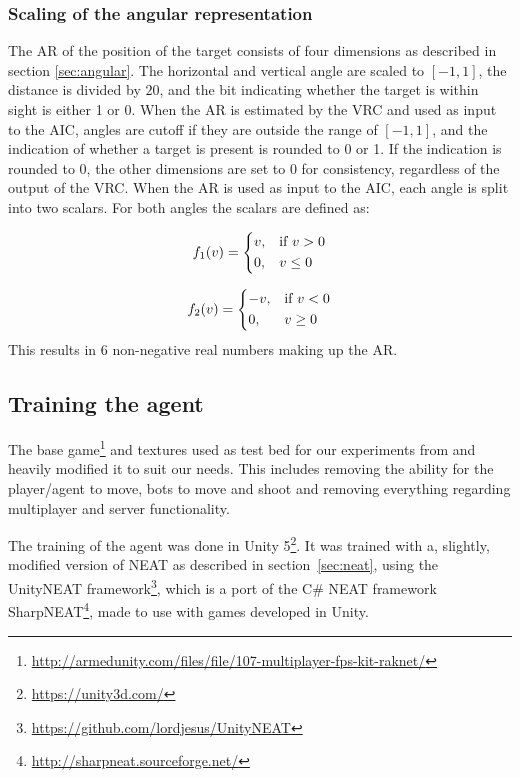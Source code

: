 \subsubsection{Scaling of the angular representation}
The AR of the position of the target consists of four dimensions as described in section \ref{sec:angular}. The horizontal and vertical angle are scaled to $[-1,1]$, the distance is divided by $20$, and the bit indicating whether the target is within sight is either 1 or 0. When the AR is estimated by the VRC and used as input to the AIC, angles are cutoff if they are outside the range of $[-1,1]$, and the indication of whether a target is present is rounded to 0 or 1. If the indication is rounded to 0, the other dimensions are set to 0 for consistency, regardless of the output of the VRC. When the AR is used as input to the AIC, each angle is split into two scalars. For both angles the scalars are defined as:

\[
    f_1(v) =  
\begin{dcases}
    v,& \text{if } v > 0\\
    0,              & v \leq 0
\end{dcases}
\]

\[
    f_2(v) =  
\begin{dcases}
    -v,& \text{if } v < 0\\
    0,              & v \geq 0
\end{dcases}
\]
\noindent
This results in 6 non-negative real numbers making up the AR.

\subsection{Training the agent}
\label{sub:training-neat}
The base game\footnote{\url{http://armedunity.com/files/file/107-multiplayer-fps-kit-raknet/}} and textures used as test bed for our experiments from and heavily modified it to suit our needs. This includes removing the ability for the player/agent to move, bots to move and shoot and removing everything regarding multiplayer and server functionality. 

The training of the agent was done in Unity 5\footnote{\url{https://unity3d.com/}}.
It was trained with a, slightly, modified version of NEAT as described in section~\ref{sec:neat}, using the UnityNEAT framework\footnote{\url{https://github.com/lordjesus/UnityNEAT}}, which is a port of the C\# NEAT framework SharpNEAT\footnote{\url{http://sharpneat.sourceforge.net/}}, made to use with games developed in Unity.

